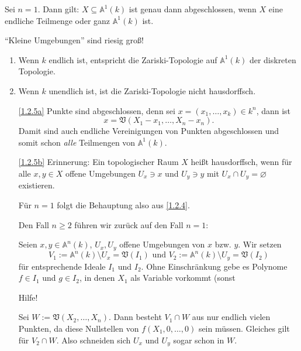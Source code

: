 \documentclass[a4paper,12pt]{scrbook}
\makeatletter
\theoremstyle{blah}
\theoremstyle{stz}
\renewcommand{\proofname}{Beweis}
\renewenvironment{proof}[1][\proofname]{\par
  \pushQED{\qed}%
  \normalfont \topsep6\p@\@plus6\p@\relax
  \trivlist
  \item[\hskip\labelsep
        \itshape
    #1\@addpunct{:}]\ignorespaces
}{%
  \popQED\endtrivlist\@endpefalse
}
\def\A{\mathbb{A}}
\def\V{\mathfrak{V}}
\newcommand{\leer}{\ensuremath{\varnothing}}
\makeatother
\begin{document}
\begin{bsp}\label{1.2.4}
Sei $n=1$. Dann gilt: $X\subseteq\A^{1}(k)$ ist genau dann abgeschlossen, wenn $X$ eine endliche Teilmenge oder ganz $\A^{1}(k)$ ist.
\end{bsp}

\begin{w}\enquote{Kleine Umgebungen} sind riesig groß!\end{w}

\begin{bem}\label{1.2.5}
\begin{enumerate}
\item\label{1.2.5a} Wenn $k$ endlich ist, entspricht die Zariski-Topologie auf $\A^{1}(k)$ der diskreten Topologie.
\item\label{1.2.5b} Wenn $k$ unendlich ist, ist die Zariski-Topologie nicht hausdorffsch.
\end{enumerate}\end{bem}
\begin{proof}\begin{enumerate}
\item[\ref{1.2.5a}] Punkte sind abgeschlossen, denn sei $x=(x_{1},\dotsc,x_{k})\in k^{n}$, dann ist
\[{x}=\V(X_{1}-x_{1},\dotsc,X_{n}-x_{n}).\]
Damit sind auch endliche Vereinigungen von Punkten abgeschlossen und somit schon \emph{alle} Teilmengen von $\A^{1}(k)$.
\item[\ref{1.2.5b}] {\sc Erinnerung:} Ein topologischer Raum $X$ heißt hausdorffsch, wenn für alle $x,y\in X$ offene Umgebungen $U_{x}\ni x$ und $U_{y}\ni y$ mit $U_{x}\cap U_{y}=\leer$ existieren.

Für $n=1$ folgt die Behauptung also aus \autoref{1.2.4}.

Den Fall $n\geq 2$ führen wir zurück auf den Fall $n=1$:

Seien $x,y\in\A^{n}(k)$, $U_{x},U_{y}$ offene Umgebungen von $x$ bzw. $y$. Wir setzen
\[V_{1}:=\A^{n}(k)\setminus U_{x} = \V(I_{1})\text{ und }V_{2}:=\A^{n}(k)\setminus U_{y}=\V(I_{2})\]
für entsprechende Ideale $I_{1}$ und $I_{2}$. Ohne Einschränkung gebe es Polynome $f\in I_{1}$ und $g\in I_{2}$, in denen $X_{1}$ als Variable vorkommt (sonst

\begin{w}Hilfe!\end{w}

Sei $W:=\V(X_{2},\dotsc,X_{n})$. Dann besteht $V_{1}\cap W$ aus nur endlich vielen Punkten, da diese Nullstellen von $f(X_{1},0,\dotsc,0)$ sein müssen. Gleiches gilt für $V_{2}\cap W$. Also schneiden sich $U_{x}$ und $U_{y}$ sogar schon in $W$.\qedhere
\end{enumerate}\end{proof}
\end{document}

